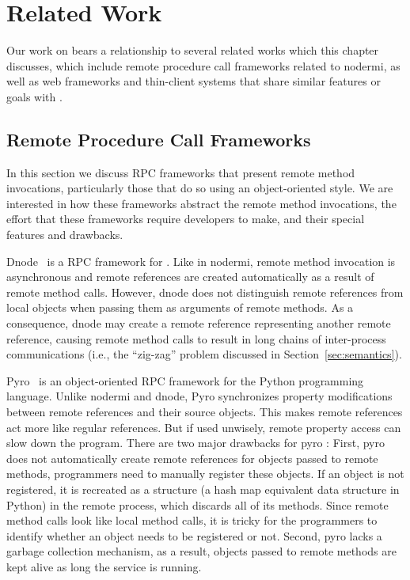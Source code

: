 \chapter{Related Work}

Our work on \cb bears a relationship to several related works
which this chapter discusses, which include remote procedure call frameworks 
related to nodermi, as well as web frameworks and thin-client systems
that share similar features or goals with \cb.

\section{Remote Procedure Call Frameworks}
\label{sec:relatedrpc}

In this section we discuss RPC frameworks that present remote method
invocations, particularly those that do so using an object-oriented style.  
We are interested in how these
frameworks abstract the remote method invocations, the effort that these
frameworks require developers to make, and their special features and
drawbacks.

Dnode~\cite{dnode} is a RPC framework for \nodejs{}.  Like in nodermi, remote
method invocation is asynchronous and remote references are created automatically
as a result of remote method calls. However, dnode does not distinguish remote
references from local objects when passing them as arguments of remote
methods. As a consequence, dnode may create a remote reference representing
another remote reference, causing remote method calls to result in long chains
of inter-process communications (i.e., the ``zig-zag'' problem discussed in
Section~\ref{sec:semantics}). 



 
Pyro~\cite{pyro} is an object-oriented RPC framework for the Python programming
language. Unlike nodermi and dnode, Pyro synchronizes  property modifications
between remote references and their source objects. This makes remote
references act more like regular references.  But if used unwisely, remote
property access can slow down the program. There are two major drawbacks for
pyro : First, pyro does not automatically create remote references for objects
passed to remote methods, programmers need to manually register these objects.
If an object is not registered, it is recreated as a  structure (a
hash map equivalent data structure in Python) in the remote process, which discards
all of its methods. Since remote method calls look like local method calls, it is
tricky for the programmers to identify whether an object needs to be
registered or not.  Second, pyro lacks a garbage collection mechanism, 
as a result, objects passed to remote methods are kept alive as long the 
service is running.


